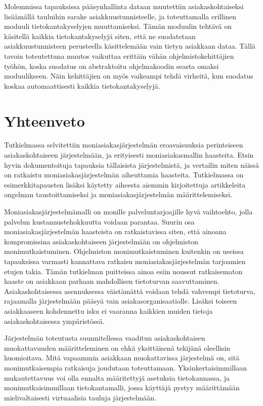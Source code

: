 Molemmissa tapauksissa pääsynhallinta dataan muutettiin asiakaskohtaiseksi lisäämällä tauluihin sarake asiakkuustunnisteelle, ja toteuttamalla erillinen moduuli tietokantakyselyjen muuttamiseksi. Tämän moduulin tehtävä on käsitellä kaikkia tietokantakyselyjä siten, että ne suodatetaan asiakkuustunnisteen perusteella käsittelemään vain tietyn asiakkaan dataa. Tällä tavoin toteutettuna muutos vaikuttaa erittäin vähän ohjelmistokehittäjien työhön, koska suodatus on abstraktoitu ohjelmakoodin seasta omaksi moduulikseen. Näin kehittäjien on myös vaikeampi tehdä virheitä, kun suodatus koskaa automaattisesti kaikkia tietokantakyselyjä.

\chapter{Yhteenveto}
Tutkielmassa selvitettiin moniasiakasjärjestelmän eroavaisuuksia perinteiseen asiakaskohtaiseen järjestelmään, ja erityisesti moniasiakasmallin haasteita. Etsin hyvin dokumentoituja tapauksia tällaisista järjestelmistä, ja vertailin miten näissä on ratkaistu moniasiakasjärjestelmän aiheuttamia haasteita. Tutkielmassa on esimerkkitapausten lisäksi käytetty aiheesta aiemmin kirjoitettuja artikkeleita ongelman taustoittamiseksi ja moniasiakasjärjestelmän määrittelemiseksi.

Moniasiakasjärjestelmämalli on monille palveluntarjoajille hyvä vaihtoehto, jolla palvelun kustannustehokkuutta voidaan parantaa. Suurin osa moniasiakasjärjestelmän haasteista on ratkaistavissa siten, että ainoana kompromissina asiakaskohtaiseen järjestelmään on ohjelmiston monimutkaistuminen. Ohjelmiston monimutkaistuminen kuitenkin on useissa tapauksissa varmasti kannattava ratkaisu moniasiakasjärjestelmän tarjoamien etujen takia. Tämän tutkielman puitteissa ainoa esiin noussut ratkaisematon haaste on asiakkaan parhaan mahdollisen tietoturvan saavuttaminen. Asiakaskohtaisessa asennuksessa väistämättä voidaan tehdä vahvempi tietoturva, rajaamalla järjestelmään pääsyä vain asiakasorganisaatiolle. Lisäksi toiseen asiakkaaseen kohdennettu isku ei vaaranna kaikkien muiden tietoja asiakaskohtaisessa ympäristössä.

Järjestelmän toteutusta suunnitellessa vaaditun asiakaskohtaisen muokattavuuden määritteleminen on ehkä yksittäisenä tekijänä oleellisin huomioitava. Mitä vapaammin asiakkaan muokattavissa järjestelmä on, sitä monimutkaisempia ratkaisuja joudutaan toteuttamaan. Yksinkertaisimmillaan mukautettavuus voi olla ennalta määritettyjä asetuksia tietokannassa, ja monimutkaisimmillaan tietokantamalli, jossa käyttäjä pystyy määrittämään mielivaltaisesti virtuaalisia tauluja järjestelmään.


